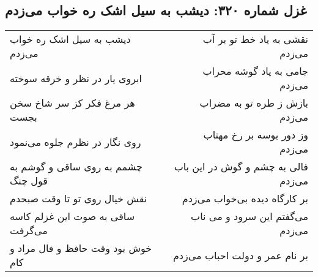 \begin{center}
\section*{غزل شماره ۳۲۰: دیشب به سیل اشک ره خواب می‌زدم}
\label{sec:sh320}
\begin{longtable}{l p{0.5cm} r}
دیشب به سیل اشک ره خواب می‌زدم
&&
نقشی به یاد خط تو بر آب می‌زدم
\\
ابروی یار در نظر و خرقه سوخته
&&
جامی به یاد گوشه محراب می‌زدم
\\
هر مرغ فکر کز سر شاخ سخن بجست
&&
بازش ز طره تو به مضراب می‌زدم
\\
روی نگار در نظرم جلوه می‌نمود
&&
وز دور بوسه بر رخ مهتاب می‌زدم
\\
چشمم به روی ساقی و گوشم به قول چنگ
&&
فالی به چشم و گوش در این باب می‌زدم
\\
نقش خیال روی تو تا وقت صبحدم
&&
بر کارگاه دیده بی‌خواب می‌زدم
\\
ساقی به صوت این غزلم کاسه می‌گرفت
&&
می‌گفتم این سرود و می ناب می‌زدم
\\
خوش بود وقت حافظ و فال مراد و کام
&&
بر نام عمر و دولت احباب می‌زدم
\\
\end{longtable}
\end{center}
